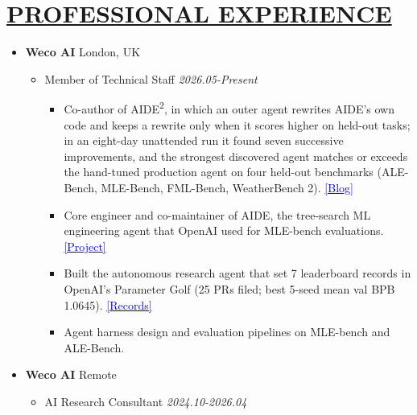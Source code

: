 \documentclass[11pt]{article}
\begin{document}
%
\section*{\centering\underline{PROFESSIONAL EXPERIENCE}}
\begin{itemize}[leftmargin=0em, noitemsep, nolistsep]
    \setlength\itemsep{1em}
    \item[] \large\textbf{Weco AI} \hfill London, UK
        \begin{itemize}[noitemsep, nolistsep, leftmargin=0em]
            \item[] Member of Technical Staff \hfill \textit{2026.05-Present}
             \begin{itemize}
                \small
                \item[--] Co-author of AIDE\textsuperscript{2}, in which an outer agent rewrites AIDE's own code and keeps a rewrite only when it scores higher on held-out tasks; in an eight-day unattended run it found seven successive improvements, and the strongest discovered agent matches or exceeds the hand-tuned production agent on four held-out benchmarks (ALE-Bench, MLE-Bench, FML-Bench, WeatherBench 2). \href{https://www.weco.ai/blog/first-evidence-of-recursive-self-improvement}{\textcolor{blue}{[Blog]}}
                \item[--] Core engineer and co-maintainer of AIDE, the tree-search ML engineering agent that OpenAI used for MLE-bench evaluations. \href{https://github.com/WecoAI/aideml}{\textcolor{blue}{[Project]}}
                \item[--] Built the autonomous research agent that set 7 leaderboard records in OpenAI's Parameter Golf (25 PRs filed; best 5-seed mean val BPB 1.0645). \href{https://github.com/openai/parameter-golf/tree/main/records/track_10min_16mb}{\textcolor{blue}{[Records]}}
                \item[--] Agent harness design and evaluation pipelines on MLE-bench and ALE-Bench.
             \end{itemize}
        \end{itemize}
    \item[] \large\textbf{Weco AI} \hfill Remote
        \begin{itemize}[noitemsep, nolistsep, leftmargin=0em]
            \item[] AI Research Consultant \hfill \textit{2024.10-2026.04}
             \begin{itemize}
                \small

\end{itemize}
\end{itemize}
\end{itemize}
\end{document}
